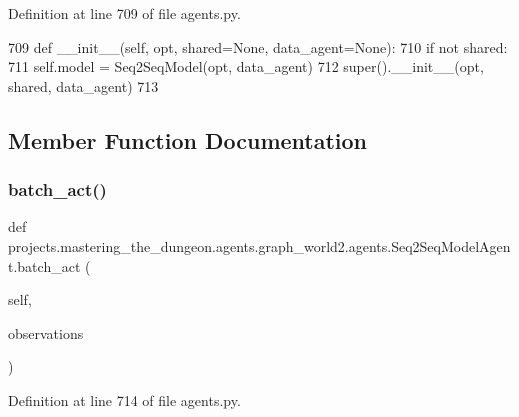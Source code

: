 Definition at line 709 of file agents.\+py.


\begin{DoxyCode}
709     \textcolor{keyword}{def }\_\_init\_\_(self, opt, shared=None, data\_agent=None):
710         \textcolor{keywordflow}{if} \textcolor{keywordflow}{not} shared:
711             self.model = Seq2SeqModel(opt, data\_agent)
712         super().\_\_init\_\_(opt, shared, data\_agent)
713 
\end{DoxyCode}


\subsection{Member Function Documentation}
\mbox{\label{classprojects_1_1mastering__the__dungeon_1_1agents_1_1graph__world2_1_1agents_1_1Seq2SeqModelAgent_a4a6f60aa35a0fcf6e033cf2fef28342b}} 
\subsubsection{\texorpdfstring{batch\+\_\+act()}{batch\_act()}}
{\footnotesize\ttfamily def projects.\+mastering\+\_\+the\+\_\+dungeon.\+agents.\+graph\+\_\+world2.\+agents.\+Seq2\+Seq\+Model\+Agent.\+batch\+\_\+act (\begin{DoxyParamCaption}\item[{}]{self,  }\item[{}]{observations }\end{DoxyParamCaption})}



Definition at line 714 of file agents.\+py.


